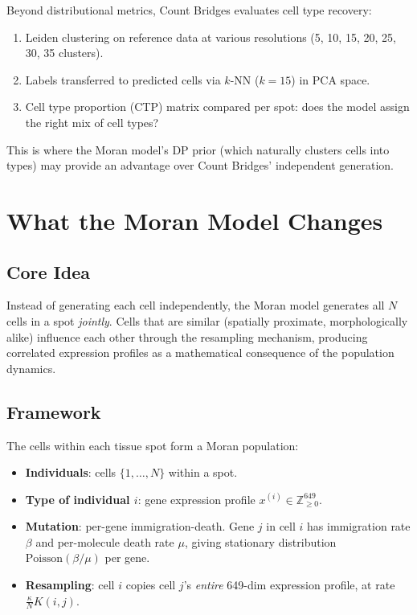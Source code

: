 \documentclass[11pt]{article}
\begin{document}
Beyond distributional metrics, Count Bridges evaluates cell type recovery:
\begin{enumerate}
  \item Leiden clustering on reference data at various resolutions (5, 10, 15, 20, 25, 30, 35 clusters).
  \item Labels transferred to predicted cells via $k$-NN ($k = 15$) in PCA space.
  \item Cell type proportion (CTP) matrix compared per spot: does the model assign the right mix of cell types?
\end{enumerate}

This is where the Moran model's DP prior (which naturally clusters cells into types) may provide an advantage over Count Bridges' independent generation.

\section{What the Moran Model Changes}

\subsection{Core Idea}

Instead of generating each cell independently, the Moran model generates all $N$ cells in a spot \emph{jointly}. Cells that are similar (spatially proximate, morphologically alike) influence each other through the resampling mechanism, producing correlated expression profiles as a mathematical consequence of the population dynamics.

\subsection{Framework}

The cells within each tissue spot form a Moran population:
\begin{itemize}
  \item \textbf{Individuals}: cells $\{1, \ldots, N\}$ within a spot.
  \item \textbf{Type of individual $i$}: gene expression profile $x^{(i)} \in \mathbb{Z}_{\geq 0}^{649}$.
  \item \textbf{Mutation}: per-gene immigration-death. Gene $j$ in cell $i$ has immigration rate $\beta$ and per-molecule death rate $\mu$, giving stationary distribution $\text{Poisson}(\beta/\mu)$ per gene.
  \item \textbf{Resampling}: cell $i$ copies cell $j$'s \emph{entire} 649-dim expression profile, at rate $\frac{\kappa}{N} K(i, j)$.
\end{itemize}
\end{document}
